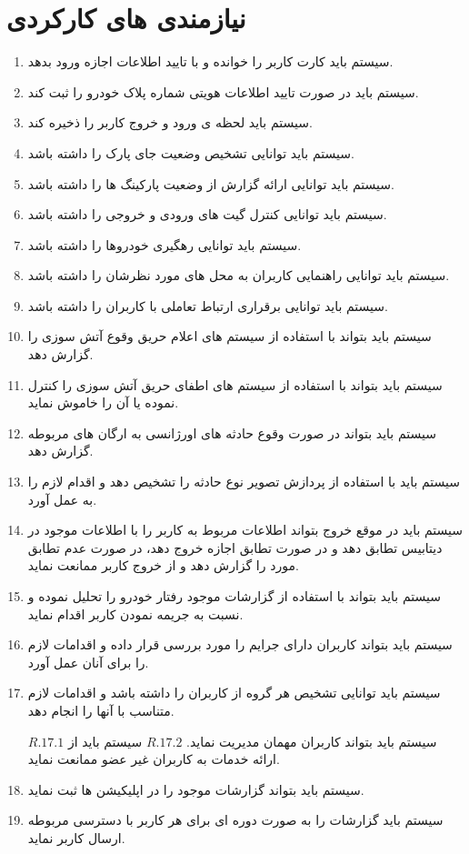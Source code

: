 \documentclass[oneside,a4paper,12pt]{book}
\begin{document}
	\section{نیازمندی های کارکردی}
	\begin{enumerate}[$ R. 1 $]
		
		\item
		سیستم باید کارت کاربر را خوانده و با تایید اطلاعات اجازه ورود بدهد.
		\item
		سیستم باید در صورت تایید اطلاعات هویتی شماره پلاک خودرو را ثبت کند.
		\item
		سیستم باید لحظه ی ورود و خروج کاربر را ذخیره کند.
		\item
		سیستم باید توانایی تشخیص وضعیت جای پارک را داشته باشد.
		\item
		سیستم باید توانایی ارائه گزارش از وضعیت پارکینگ ها را داشته باشد.
		\item
		سیستم باید توانایی کنترل گیت های ورودی و خروجی را داشته باشد.
		\item
		سیستم باید توانایی رهگیری خودروها را داشته باشد.
		\item
		سیستم باید توانایی راهنمایی کاربران به محل های مورد نظرشان را داشته باشد.
		\item
		سیستم باید توانایی برقراری ارتباط تعاملی با کاربران را داشته باشد.
		\item
		سیستم باید بتواند با استفاده از سیستم های اعلام حریق وقوع آتش سوزی را گزارش دهد.
		\item
		سیستم باید بتواند با استفاده از سیستم های اطفای حریق آتش سوزی را  کنترل نموده یا آن را خاموش نماید.
		\item
		سیستم باید بتواند در صورت وقوع حادثه های اورژانسی به ارگان های مربوطه گزارش دهد.
		\item
		سیستم باید با استفاده از پردازش تصویر نوع حادثه را تشخیص دهد و اقدام لازم را به عمل آورد.
		\item
		سیستم باید در موقع خروج بتواند اطلاعات مربوط به کاربر را با اطلاعات موجود در دیتابیس تطابق دهد و در صورت تطابق اجازه خروج دهد، در صورت عدم تطابق مورد را گزارش دهد و از خروج کاربر ممانعت نماید.
		\item
		سیستم باید بتواند با استفاده از گزارشات موجود رفتار خودرو را تحلیل نموده و نسبت به جریمه نمودن کاربر اقدام نماید.
		\item
		سیستم باید بتواند کاربران دارای جرایم را مورد بررسی قرار داده و اقدامات لازم را برای آنان عمل آورد.
		\item
		سیستم باید توانایی تشخیص هر گروه از کاربران را داشته باشد و اقدامات لازم متناسب با آنها را انجام دهد.
		
		\subitem
		$ R. 17. 1 $		سیستم باید بتواند کاربران مهمان مدیریت نماید.
		\subitem
		$ R. 17. 2 $		سیستم باید از ارائه خدمات به کاربران غیر عضو ممانعت نماید.
		\item	
		سیستم باید بتواند گزارشات موجود را در اپلیکیشن ها ثبت نماید.
		\item
		سیستم باید گزارشات را به صورت دوره ای برای هر کاربر با دسترسی مربوطه ارسال کاربر نماید.
	
	\end{enumerate}
\end{document}
